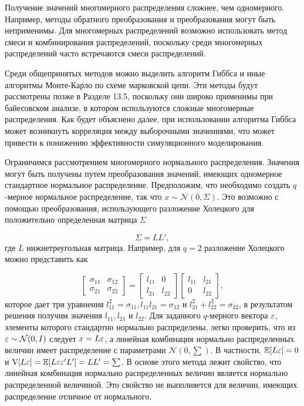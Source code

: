 Получение значений многомерного распределения сложнее, чем одномерного. Например, методы обратного преобразования и преобразования могут быть неприменимы. Для многомерных распределений возможно использовать метод смеси и комбинирования распределений, поскольку среди многомерных распределений часто встречаются смеси распределений.

Среди общепринятых методов можно выделить алгоритм Гиббса и иные алгоритмы Монте-Карло по схеме марковской цепи. Эти методы будут рассмотрены позже в Разделе 13.5, поскольку они широко применимы при байесовском анализе, в котором используются сложные многомерные распределения. Как будет объяснено далее, при использовании алгоритма Гиббса может возникнуть корреляция между выборочными значениями, что может привести к понижению эффективности симуляционного моделирования.

Ограничимся рассмотрением многомерного нормального распределения. Значения могут быть получены путем преобразования значений, имеющих одномерное стандартное нормальное распределение. Предположим, что необходимо создать $q$-мерное нормальное распределение, так что $x\sim \mathcal{N}(0,\Sigma)$. Это возможно с помощью преобразования, использующего разложение Холецкого для  положительно определенная матрица $\Sigma$ 

\[
\Sigma=LL', 
\]
где $L$ нижнетреугольная матрица. Например, для $q=2$ разложение Холецкого можно представить как

\[
\begin{bmatrix} \sigma_{11} & \sigma_{12} \\ \sigma_{21} & \sigma_{22} \end{bmatrix} = 
\begin{bmatrix} l_{11} & 0 \\ l_{21} & l_{22} \end{bmatrix}
\begin{bmatrix} l_{11} & l_{21} \\ 0 & l_{22} \end{bmatrix},
\]
которое дает три уравнения $l^{2}_{11}=\sigma_{11},l_{11}l_{21}=\sigma_{12}$ и $l^{2}_{21}+l^{2}_{22}=\sigma_{22}$, в результатом решения получим значения $l_{11},l_{21}$ и $l_{22}$. Для заданного $q$-мерного вектора $\varepsilon$, элементы которого стандартно нормально распределены, легко проверить, что из $\varepsilon \sim \mathcal{N}(0,I)$ следует $x=L\varepsilon$, а линейная комбинация нормально распределенных величин имеет распределение с параметрами $\mathcal{N}(0,\sum)$. В частности, $\mathbb{E}[L\varepsilon]=0$ и $\mathrm{V}[L\varepsilon]=\mathbb{E}[L\varepsilon\varepsilon'L']=LL'=\sum$. В основе этого метода лежит свойство, что линейная комбинация нормально распределенных величин является нормально распределенной величиной. Это свойство не выполняется для величин, имеющих распределение отличное от нормального.

